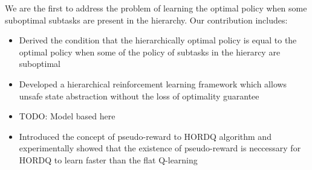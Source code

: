 We are the first to address the problem of learning the optimal policy when some 
suboptimal subtasks are present in the hierarchy.
Our contribution includes: 
\begin{itemize}
\item Derived the condition that the hierarchically optimal policy is equal to the optimal policy when some of the policy of subtasks in the hierarcy are suboptimal
\item Developed a hierarchical reinforcement learning framework which allows unsafe state abstraction without the loss of optimality guarantee
\item TODO: Model based here
\item Introduced the concept of pseudo-reward to HORDQ algorithm and experimentally showed that the existence of pseudo-reward is neccessary for HORDQ to learn faster than the flat Q-learning
\end{itemize}





\endinput
There was no clear advantage for either method in the second half of the experiment. We note that, asymptotically, model-free methods are never worse than model-based methods, and are often better because the model does not converge exactly to the true system because of structural modeling assumptions. (The case we treat here—linear models and value functions with one-step TD methods—is a rare case in which asymptotic performance of model-based and model-free methods should be identical.) The benefit of models, and of planning generally, is in rapid adaptation to new problems and situations 
